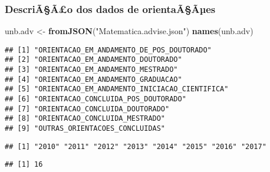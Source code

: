 \documentclass[]{article}
\newenvironment{Shaded}{\begin{snugshade}}{\end{snugshade}}
\newcommand{\KeywordTok}[1]{\textcolor[rgb]{0.13,0.29,0.53}{\textbf{#1}}}
\newcommand{\DataTypeTok}[1]{\textcolor[rgb]{0.13,0.29,0.53}{#1}}
\newcommand{\DecValTok}[1]{\textcolor[rgb]{0.00,0.00,0.81}{#1}}
\newcommand{\StringTok}[1]{\textcolor[rgb]{0.31,0.60,0.02}{#1}}
\newcommand{\OtherTok}[1]{\textcolor[rgb]{0.56,0.35,0.01}{#1}}
\newcommand{\OperatorTok}[1]{\textcolor[rgb]{0.81,0.36,0.00}{\textbf{#1}}}
\newcommand{\NormalTok}[1]{#1}
\begin{document}
\subsubsection{DescriÃ§Ã£o dos dados de
orientaÃ§Ãµes}\label{descriaao-dos-dados-de-orientaaaes}

\begin{Shaded}
\begin{Highlighting}[]
\NormalTok{unb.adv <-}\StringTok{ }\KeywordTok{fromJSON}\NormalTok{(}\StringTok{"Matematica.advise.json"}\NormalTok{)}
\KeywordTok{names}\NormalTok{(unb.adv)}
\end{Highlighting}
\end{Shaded}

\begin{verbatim}
## [1] "ORIENTACAO_EM_ANDAMENTO_DE_POS_DOUTORADO"    
## [2] "ORIENTACAO_EM_ANDAMENTO_DOUTORADO"           
## [3] "ORIENTACAO_EM_ANDAMENTO_MESTRADO"            
## [4] "ORIENTACAO_EM_ANDAMENTO_GRADUACAO"           
## [5] "ORIENTACAO_EM_ANDAMENTO_INICIACAO_CIENTIFICA"
## [6] "ORIENTACAO_CONCLUIDA_POS_DOUTORADO"          
## [7] "ORIENTACAO_CONCLUIDA_DOUTORADO"              
## [8] "ORIENTACAO_CONCLUIDA_MESTRADO"               
## [9] "OUTRAS_ORIENTACOES_CONCLUIDAS"
\end{verbatim}

\begin{Shaded}
\end{Shaded}

\begin{verbatim}
## [1] "2010" "2011" "2012" "2013" "2014" "2015" "2016" "2017"
\end{verbatim}

\begin{Shaded}
\end{Shaded}

\begin{verbatim}
## [1] 16
\end{verbatim}

\begin{Shaded}
\end{Shaded}
\end{document}
